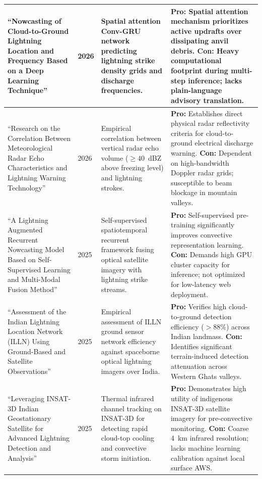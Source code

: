 \documentclass[12pt,a4paper]{report}
\begin{document}
\begin{xltabular}{\textwidth}{|L{3.8cm}|C{1.3cm}|L{4.3cm}|Y|}
``Nowcasting of Cloud-to-Ground Lightning Location and Frequency Based on a Deep Learning Technique'' \cite{li2026nowcasting} & 2026 & Spatial attention Conv-GRU network predicting lightning strike density grids and discharge frequencies. & \textbf{Pro:} Spatial attention mechanism prioritizes active updrafts over dissipating anvil debris. \newline \textbf{Con:} Heavy computational footprint during multi-step inference; lacks plain-language advisory translation. \\ \hline
``Research on the Correlation Between Meteorological Radar Echo Characteristics and Lightning Warning Technology'' \cite{li2026correlation} & 2026 & Empirical correlation between vertical radar echo volume ($\ge 40$~dBZ above freezing level) and lightning strokes. & \textbf{Pro:} Establishes direct physical radar reflectivity criteria for cloud-to-ground electrical discharge warning. \newline \textbf{Con:} Dependent on high-bandwidth Doppler radar grids; susceptible to beam blockage in mountain valleys. \\ \hline
``A Lightning Augmented Recurrent Nowcasting Model Based on Self-Supervised Learning and Multi-Modal Fusion Method'' \cite{zhang2025lightning} & 2025 & Self-supervised spatiotemporal recurrent framework fusing optical satellite imagery with lightning strike streams. & \textbf{Pro:} Self-supervised pre-training significantly improves convective representation learning. \newline \textbf{Con:} Demands high GPU cluster capacity for inference; not optimized for low-latency web deployment. \\ \hline
``Assessment of the Indian Lightning Location Network (ILLN) Using Ground-Based and Satellite Observations'' \cite{ghosh2025assessment} & 2025 & Empirical assessment of ILLN ground sensor network efficiency against spaceborne optical lightning imagers over India. & \textbf{Pro:} Verifies high cloud-to-ground detection efficiency ($> 88$\%) across Indian landmass. \newline \textbf{Con:} Identifies significant terrain-induced detection attenuation across Western Ghats valleys. \\ \hline
``Leveraging INSAT-3D Indian Geostationary Satellite for Advanced Lightning Detection and Analysis'' \cite{sharma2025insat} & 2025 & Thermal infrared channel tracking on INSAT-3D for detecting rapid cloud-top cooling and convective storm initiation. & \textbf{Pro:} Demonstrates high utility of indigenous INSAT-3D satellite imagery for pre-convective monitoring. \newline \textbf{Con:} Coarse 4~km infrared resolution; lacks machine learning calibration against local surface AWS. \\ \hline

\end{xltabular}
\end{document}
